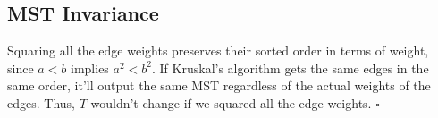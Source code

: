 \documentclass[12pt]{article}
\begin{document}
\subsection{MST Invariance}

Squaring all the edge weights preserves their sorted order in terms
of weight, since $a < b$ implies $a^2 < b^2$.
If Kruskal's algorithm gets the same edges in the same order,
it'll output the same MST regardless of the actual weights of the edges.
Thus, $T$ wouldn't change if we squared all the edge weights. $\square$
\end{document}
